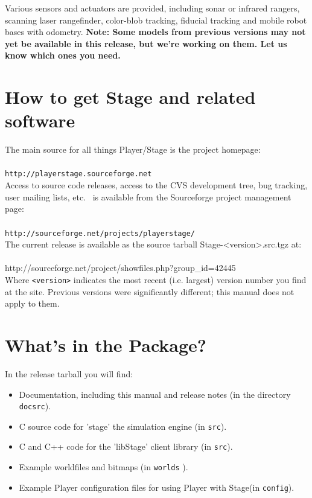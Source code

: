 \documentclass[letter,11pt,twoside]{report}
\def\HOMEPAGE {{\tt http://playerstage.sourceforge.net}}
\def\SFPAGE {{\tt http://sourceforge.net/projects/playerstage/}}
\begin{document}
Various sensors and actuators are provided, including sonar or
infrared rangers, scanning laser rangefinder, color-blob tracking,
fiducial tracking and mobile robot bases with odometry. {\bf Note:
Some models from previous versions may not yet be available in this
release, but we're working on them. Let us know which ones you need.}

\section{How to get Stage and related software}

The main source for all things Player/Stage is the project
homepage:\\\\ \indent
\HOMEPAGE\\

\noindent Access to source code releases, access to the CVS
development tree, bug tracking, user mailing lists, etc.~ is
available from the Sourceforge project management page:\\\\\indent
\SFPAGE\\

\noindent The current release is available as the source tarball
Stage-<version>.src.tgz at:\\\\ \indent
http://sourceforge.net/project/showfiles.php?group\_id=42445\\

Where \verb+<version>+ indicates the most recent (i.e. largest)
version number you find at the site.  Previous versions were
significantly different; this manual does not apply to them.

\section{What's in the Package?}

In the release tarball you will find:
\begin{itemize}
\item Documentation, including this manual and release notes (in the
  directory \verb'docsrc').
\item C source code for 'stage' the simulation engine (in \verb'src').
\item C and C++ code for the 'libStage' client library (in \verb'src').
\item Example worldfiles and bitmaps (in \verb'worlds' ).
\item Example Player configuration files for using Player with
Stage(in \verb'config').
\end{itemize}
\end{document}
